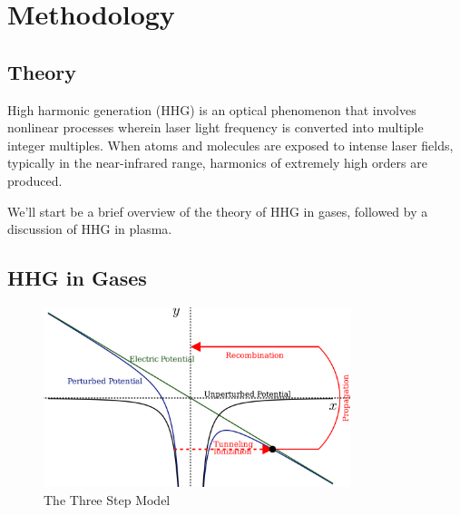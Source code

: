 \documentclass[12pt]{article}
\begin{document}
\section{Methodology}
\subsection{Theory}
High harmonic generation (HHG) is an optical phenomenon that involves nonlinear processes wherein laser light frequency is converted into multiple integer multiples. When atoms and molecules are exposed to intense laser fields, typically in the near-infrared range, harmonics of extremely high orders are produced.\cite{hhg-book}

We'll start be a brief overview of the theory of HHG in gases, followed by a discussion of HHG in plasma.

\subsection{HHG in Gases}
\begin{figure}[h]
    \centering
    \includegraphics[width=0.8\textwidth]{images/three_step_one.png}
    \caption{The Three Step Model}
    \label{fig:3-step-1}
\end{figure}
\end{document}
